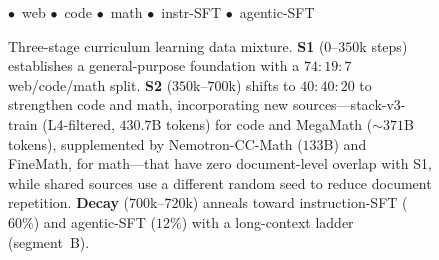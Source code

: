 \begin{figure}[t]
\begin{minipage}[t]{0.33\linewidth}
\end{minipage}

\vspace{2pt}
\textcolor{blue!60}{$\bullet$}~web \quad \textcolor{red!60}{$\bullet$}~code \quad \textcolor{green!55}{$\bullet$}~math \quad \textcolor{orange!70}{$\bullet$}~instr-SFT \quad \textcolor{purple!60}{$\bullet$}~agentic-SFT

\caption{Three-stage curriculum learning data mixture. \textbf{S1} (0--$350$k steps) establishes a general-purpose foundation with a $74{:}19{:}7$ web/code/math split. \textbf{S2} ($350$k--$700$k) shifts to $40{:}40{:}20$ to strengthen code and math, incorporating new sources---stack-v3-train (L4-filtered, $430.7$B tokens) for code and MegaMath ($\sim$$371$B tokens), supplemented by Nemotron-CC-Math ($133$B) and FineMath, for math---that have zero document-level overlap with S1, while shared sources use a different random seed to reduce document repetition. \textbf{Decay} ($700$k--$720$k) anneals toward instruction-SFT ($60\%$) and agentic-SFT ($12\%$) with a long-context ladder (segment~B).}
\label{fig:data-mix}
\end{figure}

